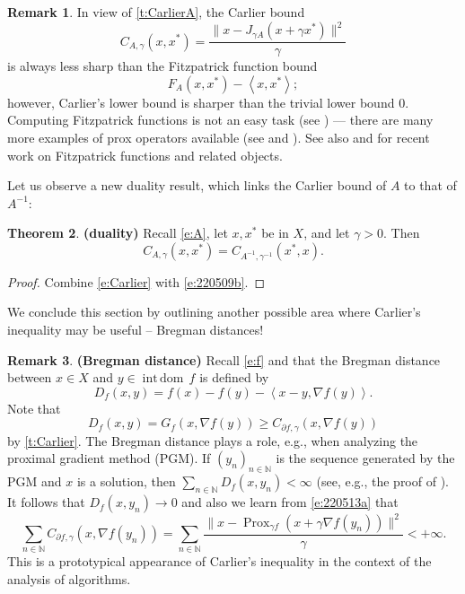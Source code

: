 \documentclass[12pt]{article}
\newcommand{\nnn}{\ensuremath{{n\in{\mathbb N}}}}
\newcommand{\scal}[2]{\left\langle{#1},{#2}  \right\rangle}
\newcommand{\prox}{\ensuremath{\operatorname{Prox}}}
\newcommand{\intdom}{\ensuremath{{\operatorname{int\,dom}}\,}}
\newcommand{\pinf}{\ensuremath{+\infty}}
\theoremstyle{definition}
\newtheorem{theorem}{Theorem}[section]
\newtheorem{remark}[theorem]{Remark}
\begin{document}
{\begin{remark}
In view of \cref{t:CarlierA}, 
the Carlier bound
\begin{equation}
C_{A,\gamma}(x,x^*) = \frac{\|x-J_{\gamma A}(x+\gamma x^*)\|^2}{\gamma} 
\end{equation}
is always less sharp than the Fitzpatrick function bound
\begin{equation}
F_{A}(x,x^*)-\scal{x}{x^*};
\end{equation}
however, Carlier's lower bound is sharper than the trivial lower bound 
$0$. 
Computing Fitzpatrick functions is not an easy task 
(see \cite{BMS}) --- there are many 
more examples of prox operators available (see \cite{BC2017} and 
\cite{Beck2}). 
See also \cite{BDL1} and \cite{BDL2} for recent work on Fitzpatrick functions and related objects. 
\end{remark}

Let us observe a new duality result, which links the Carlier bound of $A$
to that of $A^{-1}$: 

\begin{theorem} {\bf (duality)} 
\label{t:duality}
Recall \cref{e:A}, let $x,x^*$ be in $X$, and let $\gamma>0$. 
Then 
\begin{equation}
C_{A,\gamma}(x,x^*) = C_{A^{-1},\gamma^{-1}}(x^*,x). 
\end{equation}
\end{theorem}
\begin{proof}
Combine \cref{e:Carlier} with \cref{e:220509b}.
\end{proof}

We conclude this section by outlining another possible area where
Carlier's inequality may be useful -- Bregman distances!

\begin{remark} {\bf (Bregman distance)} 
Recall \cref{e:f} and that the Bregman distance between $x\in X$ and $y\in\intdom f$
is defined by 
\begin{equation}
D_f(x,y) = f(x)-f(y)-\scal{x-y}{\nabla f(y)}. 
\end{equation}
Note that 
\begin{equation}
\label{e:220513a}
D_f(x,y) = G_f(x,\nabla f(y))\geq C_{\partial f,\gamma}(x,\nabla f(y))
\end{equation}
by \cref{t:Carlier}. 
The Bregman distance plays a role, e.g., when analyzing the proximal gradient method (PGM).
If $(y_n)_\nnn$ is the sequence generated by the PGM and $x$ is a solution, then 
$\sum_\nnn D_f(x,y_n)<\infty$ (see, e.g., the proof of \cite[Theorem~10.21]{Beck2}). It follows 
that $D_f(x,y_n)\to 0$ and also we learn from \cref{e:220513a} that 
\begin{equation}
\sum_{\nnn} C_{\partial f,\gamma}(x,\nabla f(y_n))= 
\sum_\nnn \frac{\|x-\prox_{\gamma f}(x+\gamma \nabla f(y_n))\|^2}{\gamma} <\pinf.
\end{equation}
This is a prototypical appearance of Carlier's inequality in the context of the 
analysis of algorithms. 
\end{remark}


}
\end{document}
